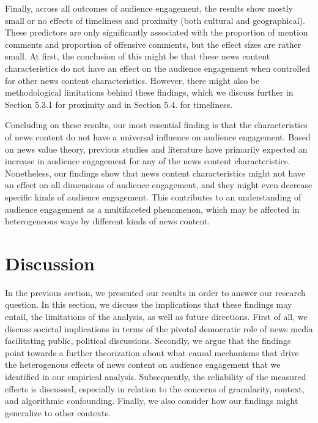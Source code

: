 \documentclass[
]{article}
\begin{document}
Finally, across all outcomes of audience engagement, the results show
mostly small or no effects of timeliness and proximity (both cultural
and geographical). These predictors are only significantly associated
with the proportion of mention comments and proportion of offensive
comments, but the effect sizes are rather small. At first, the
conclusion of this might be that these news content characteristics do
not have an effect on the audience engagement when controlled for other
news content characteristics. However, there might also be
methodological limitations behind these findings, which we discuss
further in Section 5.3.1 for proximity and in Section 5.4. for
timeliness.

Concluding on these results, our most essential finding is that the
characteristics of news content do not have a universal influence on
audience engagement. Based on news value theory, previous studies and
literature have primarily expected an increase in audience engagement
for any of the news content characteristics. Nonetheless, our findings
show that news content characteristics might not have an effect on all
dimensions of audience engagement, and they might even decrease specific
kinds of audience engagement. This contributes to an understanding of
audience engagement as a multifaceted phenomenon, which may be affected
in heterogeneous ways by different kinds of news content.

\pagebreak

\hypertarget{discussion}{%
\section{Discussion}\label{discussion}}

In the previous section, we presented our results in order to answer our
research question. In this section, we discuss the implications that
these findings may entail, the limitations of the analysis, as well as
future directions. First of all, we discuss societal implications in
terms of the pivotal democratic role of news media facilitating public,
political discussions. Secondly, we argue that the findings point
towards a further theorization about what causal mechanisms that drive
the heterogenous effects of news content on audience engagement that we
identified in our empirical analysis. Subsequently, the reliability of
the measured effects is discussed, especially in relation to the
concerns of granularity, context, and algorithmic confounding. Finally,
we also consider how our findings might generalize to other contexts.
\end{document}
